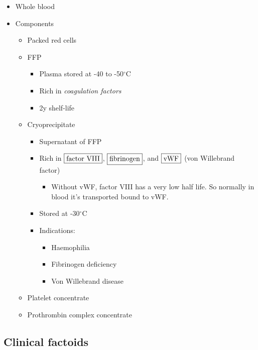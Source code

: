 \documentclass[
  14pt,
]{extarticle}
\providecommand{\tightlist}{%
  \setlength{\itemsep}{0pt}\setlength{\parskip}{0pt}}
\begin{document}
\begin{itemize}
\tightlist
\item
  Whole blood
\item
  Components

  \begin{itemize}
  \tightlist
  \item
    Packed red cells
  \item
    FFP

    \begin{itemize}
    \tightlist
    \item
      Plasma stored at -40 to -50\(^\circ\)C
    \item
      Rich in \emph{coagulation factors}
    \item
      2y shelf-life
    \end{itemize}
  \item
    Cryoprecipitate

    \begin{itemize}
    \tightlist
    \item
      Supernatant of FFP
    \item
      Rich in \(\fbox{factor VIII}\), \(\fbox{fibrinogen}\), and
      \(\fbox{vWF}\) (von Willebrand factor)

      \begin{itemize}
      \tightlist
      \item
        Without vWF, factor VIII has a very low half life. So normally
        in blood it's transported bound to vWF.
      \end{itemize}
    \item
      Stored at -30\(^\circ\)C
    \item
      Indications:

      \begin{itemize}
      \tightlist
      \item
        Haemophilia
      \item
        Fibrinogen deficiency
      \item
        Von Willebrand disease
      \end{itemize}
    \end{itemize}
  \item
    Platelet concentrate
  \item
    Prothrombin complex concentrate
  \end{itemize}
\end{itemize}

\hypertarget{clinical-factoids}{%
\subsection{Clinical factoids}\label{clinical-factoids}}
\end{document}
